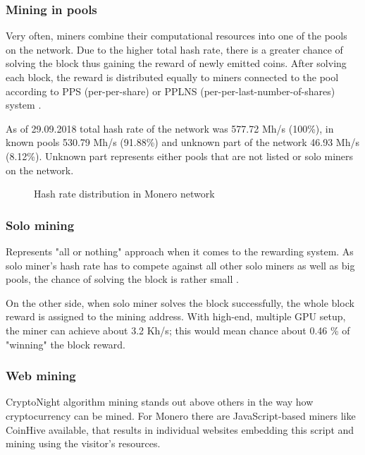 \documentclass[
  printed, %
  table,   %
  nolof,     %
  nolot,     %
           oneside, color
]{fithesis3}
\begin{document}
\subsubsection{Mining in pools}
Very often, miners combine their computational resources into one of the pools on the network. Due to the higher total hash rate, there is a greater chance of solving the block thus gaining the reward of newly emitted coins. After solving each block, the reward is distributed equally to miners connected to the pool according to PPS (per-per-share) or PPLNS (per-per-last-number-of-shares) system \cite{tarasiewicz2015cryptocurrencies}.

As of 29.09.2018 total hash rate of the network was 577.72 Mh/s (100\%), in known pools 530.79 Mh/s (91.88\%) and unknown part of the network 46.93 Mh/s (8.12\%). Unknown part represents either pools that are not listed or solo miners on the network.

\begin{figure}[H]
\begin{center}
     \end{center}
      \caption{Hash rate distribution in Monero network}
      \label{chart:range}

\end{figure}
\subsubsection{Solo mining}
Represents "all or nothing" approach when it comes to the rewarding system. As solo miner's hash rate has to compete against all other solo miners as well as big pools, the chance of solving the block is rather small \cite{cong2018decentralized}.

On the other side, when solo miner solves the block successfully, the whole block reward is assigned to the mining address. With high-end, multiple GPU setup, the miner can achieve about 3.2 Kh/s; this would mean chance about 0.46 \% of "winning" the block reward. 

\subsubsection{Web mining}
CryptoNight algorithm mining stands out above others in the way how cryptocurrency can be mined. For Monero there are JavaScript-based miners like CoinHive available, that results in individual websites embedding this script and mining using the visitor's resources. 
\end{document}
